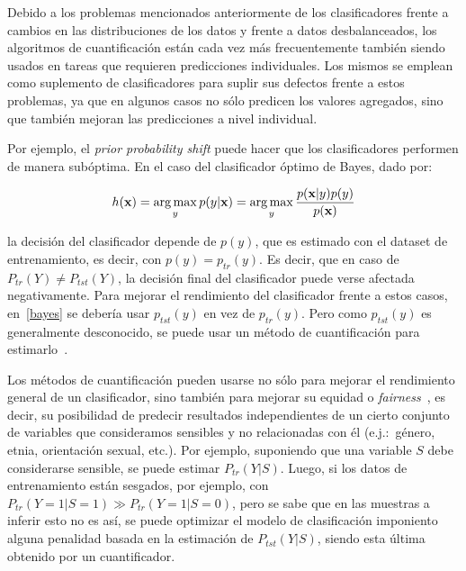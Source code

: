 Debido a los problemas mencionados anteriormente de los clasificadores frente a
cambios en las distribuciones de los datos y frente a datos desbalanceados, los
algoritmos de cuantificación están cada vez más frecuentemente también siendo
usados en tareas que requieren predicciones individuales. Los mismos se emplean
como suplemento de clasificadores para suplir sus defectos frente a estos
problemas, ya que en algunos casos no sólo predicen los valores agregados, sino
que también mejoran las predicciones a nivel individual.

Por ejemplo, el {\it prior probability shift\/} puede hacer que los
clasificadores performen de manera subóptima. En el caso del clasificador óptimo
de Bayes, dado por:

\begin{equation}
    h(\textbf{x}) = \operatorname*{arg\,max}_{y} p(y|\textbf{x}) = \operatorname*{arg\,max}_{y} \frac{p(\textbf{x}|y)p(y)}{p(\textbf{x})}
\end{equation}\label{bayes}

la decisión del clasificador depende de $p(y)$, que es estimado con el dataset
de entrenamiento, es decir, con $p(y) = p_{tr}(y)$. Es decir, que en caso de
$P_{tr}(Y) \neq P_{tst}(Y)$, la decisión final del clasificador puede verse
afectada negativamente. Para mejorar el rendimiento del clasificador frente a
estos casos, en~\ref{bayes} se debería usar $p_{tst}(y)$ en vez de $p_{tr}(y)$.
Pero como $p_{tst}(y)$ es generalmente desconocido, se puede usar un método de
cuantificación para estimarlo~\cite{saerens2002adjusting, alaiz2011class,
zhang2010transfer, xue2009quantification}.

Los métodos de cuantificación pueden usarse no sólo para mejorar el rendimiento
general de un clasificador, sino también para mejorar su equidad o {\it
fairness\/}~\cite{biswas2021ensuring}, es decir, su posibilidad de predecir
resultados independientes de un cierto conjunto de variables que consideramos
sensibles y no relacionadas con él (e.j.:~género, etnia, orientación sexual,
etc.). Por ejemplo, suponiendo que una variable $S$ debe considerarse sensible,
se puede estimar $P_{tr}(Y|S)$. Luego, si los datos de entrenamiento están
sesgados, por ejemplo, con $P_{tr}(Y=1|S=1) \gg P_{tr}(Y=1|S=0)$, pero se sabe
que en las muestras a inferir esto no es así, se puede optimizar el modelo de
clasificación imponiento alguna penalidad basada en la estimación de
$P_{tst}(Y|S)$, siendo esta última obtenido por un cuantificador.
